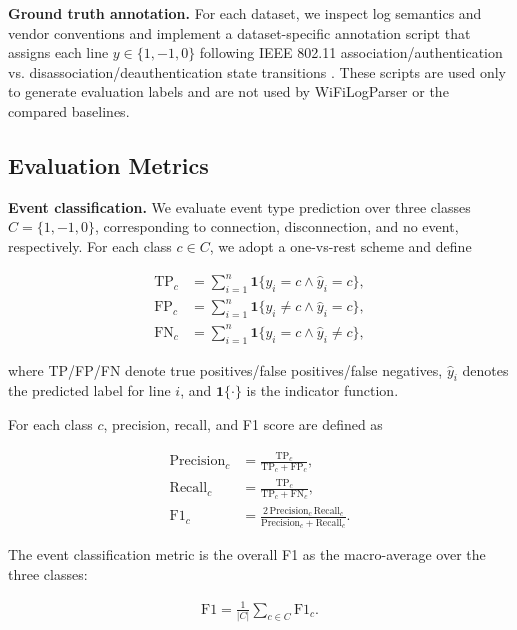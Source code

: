 \documentclass[journal]{IEEEtran}
\begin{document}
\textbf{Ground truth annotation.} For each dataset, we inspect log semantics and vendor conventions and implement a dataset-specific annotation script that assigns each line $y\in\{1,-1,0\}$ following IEEE 802.11 association/authentication vs. disassociation/deauthentication state transitions \cite{ref55}. These scripts are used only to generate evaluation labels and are not used by WiFiLogParser or the compared baselines.


\subsection{Evaluation Metrics}

\textbf{Event classification.}
We evaluate event type prediction over three classes
$C=\{1,-1,0\}$, corresponding to connection, disconnection,
and no event, respectively.
For each class $c\in C$, we adopt a one-vs-rest scheme and define

\begin{align}
	\mathrm{TP}_c & = \sum_{i=1}^{n} \mathbf{1}\{y_i=c \land \hat{y}_i=c\}, \nonumber     \\
	\mathrm{FP}_c & = \sum_{i=1}^{n} \mathbf{1}\{y_i\neq c \land \hat{y}_i=c\}, \nonumber \\
	\mathrm{FN}_c & = \sum_{i=1}^{n} \mathbf{1}\{y_i=c \land \hat{y}_i\neq c\},
\end{align}

where TP/FP/FN denote true positives/false positives/false negatives, $\hat{y}_i$ denotes the predicted label for line $i$, and
$\mathbf{1}\{\cdot\}$ is the indicator function.

For each class $c$, precision, recall, and F1 score are defined as

\begin{align}
	\mathrm{Precision}_c & =
	\frac{\mathrm{TP}_c}{\mathrm{TP}_c+\mathrm{FP}_c}, \nonumber \\
	\mathrm{Recall}_c    & =
	\frac{\mathrm{TP}_c}{\mathrm{TP}_c+\mathrm{FN}_c}, \nonumber \\
	\mathrm{F1}_c        & =
	\frac{2\,\mathrm{Precision}_c\,\mathrm{Recall}_c}
	{\mathrm{Precision}_c+\mathrm{Recall}_c}.
\end{align}

The event classification metric is the overall F1 as the macro-average over the three classes:

\begin{align}
	\mathrm{F1}
	=
	\frac{1}{|C|}
	\sum_{c\in C}
	\mathrm{F1}_c.
\end{align}
\end{document}
